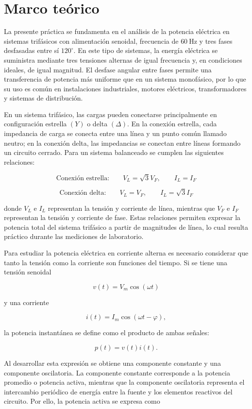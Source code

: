 \section{Marco teórico}
	
	La presente práctica se fundamenta en el análisis de la potencia eléctrica en sistemas trifásicos con alimentación senoidal, frecuencia de $60~\text{Hz}$ y tres fases desfasadas entre sí $120^\circ$. En este tipo de sistemas, la energía eléctrica se suministra mediante tres tensiones alternas de igual frecuencia y, en condiciones ideales, de igual magnitud. El desfase angular entre fases permite una transferencia de potencia más uniforme que en un sistema monofásico, por lo que su uso es común en instalaciones industriales, motores eléctricos, transformadores y sistemas de distribución.
	
	En un sistema trifásico, las cargas pueden conectarse principalmente en configuración estrella $(Y)$ o delta $(\Delta)$. En la conexión estrella, cada impedancia de carga se conecta entre una línea y un punto común llamado neutro; en la conexión delta, las impedancias se conectan entre líneas formando un circuito cerrado. Para un sistema balanceado se cumplen las siguientes relaciones:
	
	\[
	\text{Conexión estrella:} \qquad V_L = \sqrt{3}V_F, \qquad I_L = I_F
	\]
	
	\[
	\text{Conexión delta:} \qquad V_L = V_F, \qquad I_L = \sqrt{3}I_F
	\]
	
	donde $V_L$ e $I_L$ representan la tensión y corriente de línea, mientras que $V_F$ e $I_F$ representan la tensión y corriente de fase. Estas relaciones permiten expresar la potencia total del sistema trifásico a partir de magnitudes de línea, lo cual resulta práctico durante las mediciones de laboratorio.
	
	Para estudiar la potencia eléctrica en corriente alterna es necesario considerar que tanto la tensión como la corriente son funciones del tiempo. Si se tiene una tensión senoidal
	
	\[
	v(t)=V_m\cos(\omega t)
	\]
	
	y una corriente
	
	\[
	i(t)=I_m\cos(\omega t-\varphi),
	\]
	
	la potencia instantánea se define como el producto de ambas señales:
	
	\[
	p(t)=v(t)i(t).
	\]
	
	Al desarrollar esta expresión se obtiene una componente constante y una componente oscilatoria. La componente constante corresponde a la potencia promedio o potencia activa, mientras que la componente oscilatoria representa el intercambio periódico de energía entre la fuente y los elementos reactivos del circuito. Por ello, la potencia activa se expresa como
	

